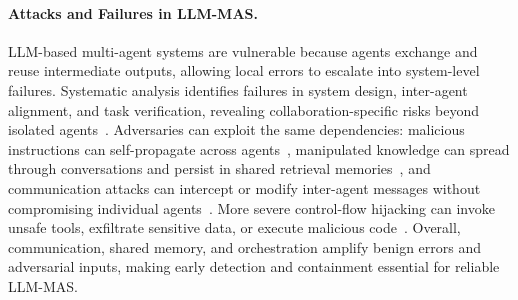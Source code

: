 \documentclass[letterpaper]{article} %
\begin{document}


\paragraph{Attacks and Failures in LLM-MAS.}LLM-based multi-agent systems are vulnerable because agents exchange and reuse intermediate outputs, allowing local errors to escalate into system-level failures. Systematic analysis identifies failures in system design, inter-agent alignment, and task verification, revealing collaboration-specific risks beyond isolated agents~\cite{cemri2025why}. Adversaries can exploit the same dependencies: malicious instructions can self-propagate across agents~\cite{lee2024promptinfection}, manipulated knowledge can spread through conversations and persist in shared retrieval memories~\cite{ju2024flooding}, and communication attacks can intercept or modify inter-agent messages without compromising individual agents~\cite{he2025redteaming}. More severe control-flow hijacking can invoke unsafe tools, exfiltrate sensitive data, or execute malicious code~\cite{triedman2025maliciouscode}. Overall, communication, shared memory, and orchestration amplify benign errors and adversarial inputs, making early detection and containment essential for reliable LLM-MAS.
\end{document}
